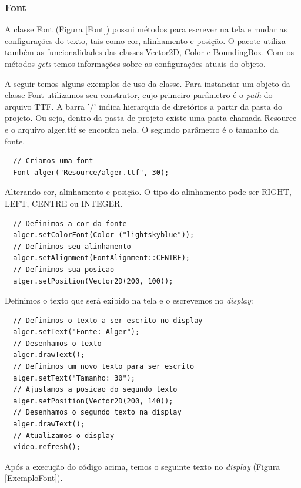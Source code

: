 \subsubsection{Font}
%
%
A classe Font (Figura \ref{Font}) possui métodos para escrever na tela e mudar as configurações do texto, tais como cor, alinhamento e posição. O pacote utiliza também as funcionalidades das classes Vector2D, Color e BoundingBox. Com os métodos \textit{gets} temos informações sobre as configurações atuais do objeto.
\par 
A seguir temos alguns exemplos de uso da classe. Para instanciar um objeto da classe Font utilizamos seu construtor, cujo primeiro parâmetro é o \textit{path} do arquivo TTF. A barra '/' indica hierarquia de diretórios a partir da pasta do projeto. Ou seja, dentro da pasta de projeto existe uma pasta chamada Resource e o arquivo alger.ttf se encontra nela. O segundo parâmetro é o tamanho da fonte.
%
\begin{lstlisting}
  // Criamos uma font
  Font alger("Resource/alger.ttf", 30);
\end{lstlisting}
%
\par
Alterando cor, alinhamento e posição. O tipo do alinhamento pode ser RIGHT, LEFT, CENTRE ou INTEGER.
%
\begin{lstlisting}
  // Definimos a cor da fonte
  alger.setColorFont(Color ("lightskyblue"));
  // Definimos seu alinhamento
  alger.setAlignment(FontAlignment::CENTRE);
  // Definimos sua posicao
  alger.setPosition(Vector2D(200, 100));
\end{lstlisting}
%
\par 
Definimos o texto que será exibido na tela e o escrevemos no \textit{display}:
%
\begin{lstlisting}
  // Definimos o texto a ser escrito no display
  alger.setText("Fonte: Alger");
  // Desenhamos o texto
  alger.drawText();
  // Definimos um novo texto para ser escrito
  alger.setText("Tamanho: 30");
  // Ajustamos a posicao do segundo texto
  alger.setPosition(Vector2D(200, 140));
  // Desenhamos o segundo texto na display
  alger.drawText();
  // Atualizamos o display
  video.refresh();
\end{lstlisting}
%
Após a execução do código acima, temos o seguinte texto no \textit{display} (Figura \ref{ExemploFont}).
%
%
%
